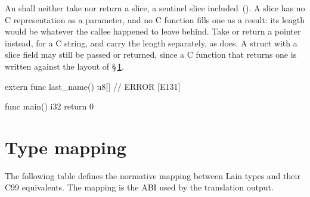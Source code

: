 \pnum
An  shall neither take nor return a slice, a sentinel slice
included~().  A slice has no C representation as a parameter, and no C
function fills one as a result: its length would be whatever the callee happened to leave
behind.  Take or return a pointer instead,  for a C string, and carry the length
separately, as  does.  A struct with a slice field may still be passed or returned,
since a C function that returns one is written against the layout of
\S\,\ref{sec:interop.types}.

\begin{laincode}
extern func last_name() u8[]    // ERROR [E131]

func main() i32 {
    return 0
}
\end{laincode}

\section{Type mapping}
\label{sec:interop.types}

\pnum
The following table defines the normative mapping between Lain types and
their C99 equivalents.  The mapping is the ABI used by the translation
output.

